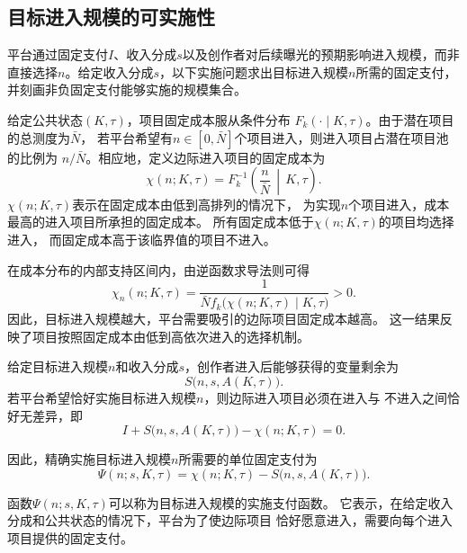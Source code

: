 \documentclass[UTF8, a4paper, 12pt, fontset=fandol]{ctexart}
\theoremstyle{definition}
\theoremstyle{remark}
\begin{document}
\subsection{目标进入规模的可实施性}
平台通过固定支付$I$、收入分成$s$以及创作者对后续曝光的预期影响进入规模，而非
直接选择$n$。给定收入分成$s$，以下实施问题求出目标进入规模$n$所需的固定支付，
并刻画非负固定支付能够实施的规模集合。

给定公共状态$(K,\tau)$，项目固定成本服从条件分布
$F_k(\cdot\mid K,\tau)$。由于潜在项目的总测度为$\bar N$，
若平台希望有$n\in[0,\bar N]$个项目进入，则进入项目占潜在项目池的比例为
$n/\bar N$。相应地，定义边际进入项目的固定成本为
\begin{equation*}
  \chi(n;K,\tau)
  =
  F_k^{-1}
  \left(
    \frac{n}{\bar N}
    \,\middle|\,
    K,\tau
  \right).
  \label{eq:marginal-entry-cost}
\end{equation*}
$\chi(n;K,\tau)$表示在固定成本由低到高排列的情况下，
为实现$n$个项目进入，成本最高的进入项目所承担的固定成本。
所有固定成本低于$\chi(n;K,\tau)$的项目均选择进入，
而固定成本高于该临界值的项目不进入。

在成本分布的内部支持区间内，由逆函数求导法则可得
\begin{equation*}
  \chi_n(n;K,\tau)
  =
  \frac{1}{
    \bar N
    f_k\bigl(\chi(n;K,\tau)\mid K,\tau\bigr)
  }
  >0.
  \label{eq:marginal-cost-derivative}
\end{equation*}
因此，目标进入规模越大，平台需要吸引的边际项目固定成本越高。
这一结果反映了项目按照固定成本由低到高依次进入的选择机制。

给定目标进入规模$n$和收入分成$s$，创作者进入后能够获得的变量剩余为
\begin{equation*}
  S\bigl(n,s,A(K,\tau)\bigr).
\end{equation*}
若平台希望恰好实施目标进入规模$n$，则边际进入项目必须在进入与
不进入之间恰好无差异，即
\begin{equation*}
  I
  +
  S\bigl(n,s,A(K,\tau)\bigr)
  -
  \chi(n;K,\tau)
  =
  0.
  \label{eq:marginal-entry-indifference}
\end{equation*}

因此，精确实施目标进入规模$n$所需要的单位固定支付为
\begin{equation}
  \Psi(n;s,K,\tau)
  =
  \chi(n;K,\tau)
  -
  S\bigl(n,s,A(K,\tau)\bigr).
  \label{eq:implementation-payment}
\end{equation}

函数$\Psi(n;s,K,\tau)$可以称为目标进入规模的实施支付函数。
它表示，在给定收入分成和公共状态的情况下，平台为了使边际项目
恰好愿意进入，需要向每个进入项目提供的固定支付。
\end{document}
